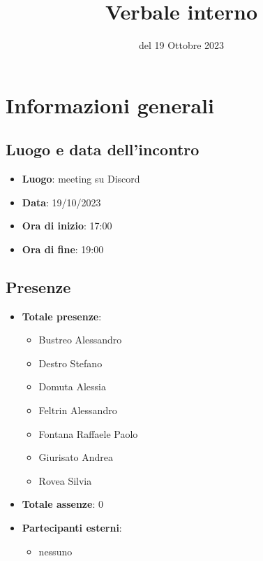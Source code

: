 \documentclass[12pt]{article}
\title{Verbale interno}
\date{del 19 Ottobre 2023}
\begin{document}
	\makefirstpage
	
	
	\clearpage
	
	\tableofcontents
	\clearpage

    \section{Informazioni generali}
    
	    \subsection{Luogo e data dell'incontro}
	    
		    \begin{itemize}
		    	\item \textbf{Luogo}: meeting su Discord
		    	\item \textbf{Data}: 19/10/2023
		    	\item \textbf{Ora di inizio}: 17:00
		    	\item \textbf{Ora di fine}: 19:00
		    \end{itemize}
    
	    \subsection{Presenze}
	    
		    \begin{itemize}
		    	\item \textbf{Totale presenze}:
		    	\begin{itemize}
		    		\item Bustreo Alessandro
		    		\item Destro Stefano
		    		\item Domuta Alessia 
		    		\item Feltrin Alessandro 
		    		\item Fontana Raffaele Paolo 
		    		\item Giurisato Andrea 
		    		\item Rovea Silvia
		    	\end{itemize}
		    	
		    	\item \textbf{Totale assenze}: 0
		    	
		    	\item \textbf{Partecipanti esterni}:
		    	\begin{itemize}
		    		\item nessuno
		    	\end{itemize}
		    \end{itemize}
    
\end{document}
